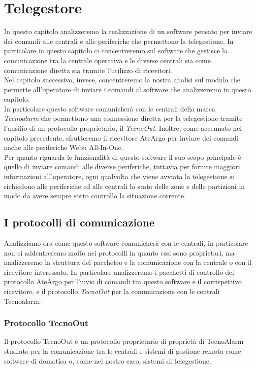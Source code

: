 \chapter{Telegestore}
\label{capitolo5}
\thispagestyle{empty}
In questo capitolo analizzeremo la realizzazione di un software pensato per inviare dei comandi alle centrali e alle periferiche che permettono la telegestione. In particolare in questo capitolo ci concentreremo sul software che gestisce  la comunicazione tra la centrale operativa e le diverse centrali sia come comunicazione diretta sia tramite l'utilizzo di ricevitori.\\
Nel capitolo successivo, invece, concentreremo la nostra analisi sul modulo che permette all'operatore di inviare i comandi al software che analizzeremo in questo capitolo.\\
In particolare questo software comunicherà con le centrali della marca \emph{Tecnoalarm} che permettono una connessione diretta per la telegestione tramite l'ausilio di un protocollo proprietario, il \emph{TecnoOut}. Inoltre, come accennato nel capitolo precedente, sfrutteremo il ricevitore AteArgo per inviare dei comandi anche alle periferiche Webu All-In-One.\\
Per quanto riguarda le funzionalità di questo software il suo scopo principale è quello di inviare comandi alle diverse periferiche, tuttavia per fornire maggiori informazioni all'operatore, ogni qualvolta che viene avviata la telegestione si richiedono alle periferiche ed alle centrali lo stato delle zone e delle partizioni in modo da avere sempre sotto controllo la situazione corrente.\\
\section{I protocolli di comunicazione}
Analizziamo ora come questo software comunicherà con le centrali, in particolare non ci addentreremo molto nei protocolli in quanto essi sono proprietari, ma analizzeremo la struttura del pacchetto e la comunicazione con la centrale o con il ricevitore interessato. In particolare analizzeremo i pacchetti di controllo del protocollo AteArgo per l'invio di comandi tra questo software e il corrispettivo ricevitore, e il protocollo \emph{TecnoOut} per la comunicazione con le centrali Tecnoalarm.
\subsection{Protocollo TecnoOut}
Il protocollo TecnoOut è un protocollo proprietario di proprietà di TecnoAlarm studiato per la comunicazione tra le centrali e sistemi di gestione remota come software di domotica o, come nel nostro caso, sistemi di telegestione.
